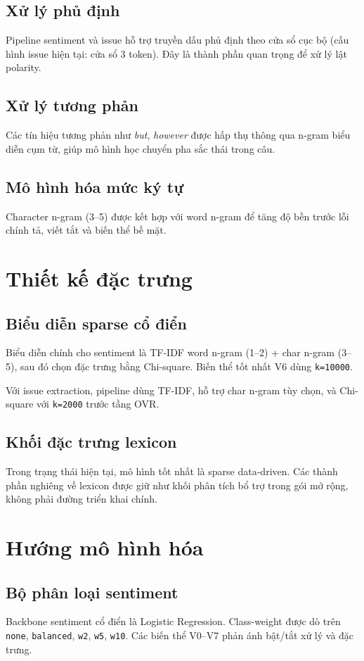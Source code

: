﻿\documentclass[12pt,a4paper]{article}
\begin{document}
\subsection{Xử lý phủ định}
Pipeline sentiment và issue hỗ trợ truyền dấu phủ định theo cửa sổ cục bộ (cấu hình issue hiện tại: cửa sổ 3 token). Đây là thành phần quan trọng để xử lý lật polarity.

\subsection{Xử lý tương phản}
Các tín hiệu tương phản như \textit{but}, \textit{however} được hấp thụ thông qua n-gram biểu diễn cụm từ, giúp mô hình học chuyển pha sắc thái trong câu.

\subsection{Mô hình hóa mức ký tự}
Character n-gram (3--5) được kết hợp với word n-gram để tăng độ bền trước lỗi chính tả, viết tắt và biến thể bề mặt.

\section{Thiết kế đặc trưng}
\subsection{Biểu diễn sparse cổ điển}
Biểu diễn chính cho sentiment là TF-IDF word n-gram (1--2) + char n-gram (3--5), sau đó chọn đặc trưng bằng Chi-square. Biến thể tốt nhất V6 dùng \texttt{k=10000}.

Với issue extraction, pipeline dùng TF-IDF, hỗ trợ char n-gram tùy chọn, và Chi-square với \texttt{k=2000} trước tầng OVR.

\subsection{Khối đặc trưng lexicon}
Trong trạng thái hiện tại, mô hình tốt nhất là sparse data-driven. Các thành phần nghiêng về lexicon được giữ như khối phân tích bổ trợ trong gói mở rộng, không phải đường triển khai chính.

\section{Hướng mô hình hóa}
\subsection{Bộ phân loại sentiment}
Backbone sentiment cổ điển là Logistic Regression. Class-weight được dò trên \texttt{none}, \texttt{balanced}, \texttt{w2}, \texttt{w5}, \texttt{w10}. Các biến thể V0--V7 phản ánh bật/tắt xử lý và đặc trưng.
\end{document}

